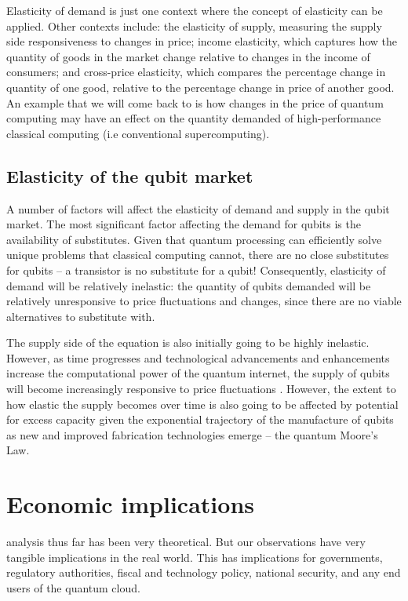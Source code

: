Elasticity of demand is just one context where the concept of elasticity can be applied. Other contexts include: the elasticity of supply, measuring the supply side responsiveness to changes in price; income elasticity, which captures how the quantity of goods in the market change relative to changes in the income of consumers; and cross-price elasticity, which compares the percentage change in quantity of one good, relative to the percentage change in price of another good. An example that we will come back to is how changes in the price of quantum computing may have an effect on the quantity demanded of high-performance classical computing (i.e conventional supercomputing).

\subsection{Elasticity of the qubit market}

A number of factors will affect the elasticity of demand and supply in the qubit market. The most significant factor affecting the demand for qubits is the availability of substitutes. Given that quantum processing can efficiently solve unique problems that classical computing cannot, there are no close substitutes for qubits -- a transistor is no substitute for a qubit! Consequently, elasticity of demand will be relatively inelastic: the quantity of qubits demanded will be relatively unresponsive to price fluctuations and changes, since there are no viable alternatives to substitute with. 

The supply side of the equation is also initially going to be highly inelastic. However, as time progresses and technological advancements and enhancements increase the computational power of the quantum internet, the supply of qubits will become increasingly responsive to price fluctuations . However, the extent to how elastic the supply becomes over time is also going to be affected by potential for excess capacity given the exponential trajectory of the manufacture of qubits as new and improved fabrication technologies emerge -- the quantum Moore's Law.

%
%

\section{Economic implications}

 analysis thus far has been very theoretical. But our observations have very tangible implications in the real world. This has implications for governments, regulatory authorities, fiscal and technology policy, national security, and any end users of the quantum cloud.

